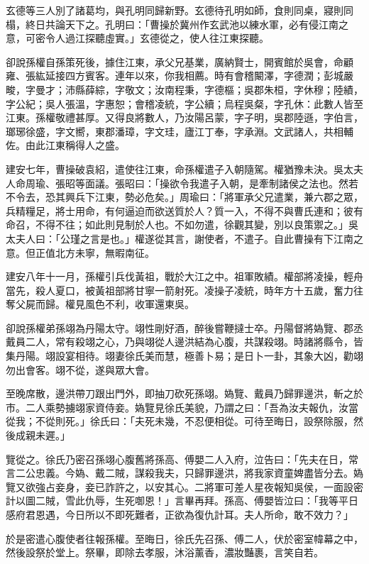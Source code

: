 玄德等三人別了諸葛均，與孔明同歸新野。玄德待孔明如師，食則同桌，寢則同榻，終日共論天下之。孔明曰：「曹操於冀州作玄武池以練水軍，必有侵江南之意，可密令人過江探聽虛實。」玄德從之，使人往江東探聽。

卻說孫權自孫策死後，據住江東，承父兄基業，廣納賢士，開賓館於吳會，命顧雍、張紘延接四方賓客。連年以來，你我相薦。時有會稽闞澤，字德潤；彭城嚴畯，字曼才；沛縣薛綜，字敬文；汝南程秉，字德樞；吳郡朱桓，字休穆；陸績，字公紀；吳人張溫，字惠恕；會稽凌統，字公續；烏程吳粲，字孔休：此數人皆至江東。孫權敬禮甚厚。又得良將數人，乃汝陽呂蒙，字子明，吳郡陸遜，字伯言，瑯琊徐盛，字文嚮，東郡潘璋，字文珪，廬江丁奉，字承淵。文武諸人，共相輔佐。由此江東稱得人之盛。

建安七年，曹操破袁紹，遣使往江東，命孫權遣子入朝隨駕。權猶豫未決。吳太夫人命周瑜、張昭等面議。張昭曰：「操欲令我遣子入朝，是牽制諸侯之法也。然若不令去，恐其興兵下江東，勢必危矣。」周瑜曰：「將軍承父兄遣業，兼六郡之眾，兵精糧足，將士用命，有何逼迫而欲送質於人？質一入，不得不與曹氏連和；彼有命召，不得不往；如此則見制於人也。不如勿遣，徐觀其變，別以良策禦之。」吳太夫人曰：「公瑾之言是也。」權遂從其言，謝使者，不遣子。自此曹操有下江南之意。但正值北方未寧，無暇南征。

建安八年十一月，孫權引兵伐黃祖，戰於大江之中。祖軍敗績。權部將凌操，輕舟當先，殺人夏口，被黃祖部將甘寧一箭射死。凌操子凌統，時年方十五歲，奮力往奪父屍而歸。權見風色不利，收軍還東吳。

卻說孫權弟孫翊為丹陽太守。翊性剛好酒，醉後嘗鞭撻士卒。丹陽督將媯覽、郡丞戴員二人，常有殺翊之心，乃與翊從人邊洪結為心腹，共謀殺翊。時諸將縣令，皆集丹陽。翊設宴相待。翊妻徐氏美而慧，極善卜易；是日卜一卦，其象大凶，勸翊勿出會客。翊不從，遂與眾大會。

至晚席散，邊洪帶刀跟出門外，即抽刀砍死孫翊。媯覽、戴員乃歸罪邊洪，斬之於市。二人乘勢擄翊家資侍妾。媯覽見徐氏美貌，乃謂之曰：「吾為汝夫報仇，汝當從我；不從則死。」徐氏曰：「夫死未幾，不忍便相從。可待至晦日，設祭除服，然後成親未遲。」

覽從之。徐氏乃密召孫翊心腹舊將孫高、傅嬰二人入府，泣告曰：「先夫在日，常言二公忠義。今媯、戴二賊，謀殺我夫，只歸罪邊洪，將我家資童婢盡皆分去。媯覽又欲強占妾身，妾已詐許之，以安其心。二將軍可差人星夜報知吳侯，一面設密計以圖二賊，雪此仇辱，生死啣恩！」言畢再拜。孫高、傅嬰皆泣曰：「我等平日感府君恩遇，今日所以不即死難者，正欲為復仇計耳。夫人所命，敢不效力？」

於是密遣心腹使者往報孫權。至晦日，徐氏先召孫、傅二人，伏於密室幃幕之中，然後設祭於堂上。祭畢，即除去孝服，沐浴薰香，濃妝豔裹，言笑自若。

